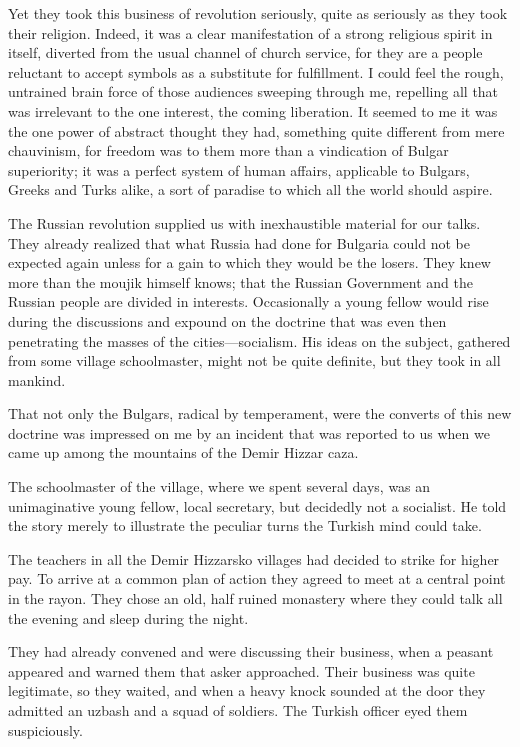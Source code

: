 \documentclass[a5paper,12pt]{book}
\begin{document}
Yet they took this business of revolution seriously, quite as seriously as they took their religion. Indeed, it was a clear manifestation of a strong religious spirit in itself, diverted from the usual channel of church service, for they are a people reluctant to accept symbols as a substitute for fulfillment. I could feel the rough, untrained brain force of those audiences sweeping through me, repelling all that was irrelevant to the one interest, the coming liberation. It seemed to me it was the one power of abstract thought they had, something quite different from mere chauvinism, for freedom was to them more than a vindication of Bulgar superiority; it was a perfect system of human affairs, applicable to Bulgars, Greeks and Turks alike, a sort of paradise to which all the world should aspire. 

The Russian revolution supplied us with inexhaustible material for our talks. They already realized that what Russia had done for Bulgaria could not be expected again unless for a gain to which they would be the losers. They knew more than the moujik himself knows; that the Russian Government and the Russian people are divided in interests. Occasionally a young fellow would rise during the discussions and expound on the doctrine that was even then penetrating the masses of the cities—socialism. His ideas on the subject, gathered from some village schoolmaster, might not be quite definite, but they took in all mankind. 

That not only the Bulgars, radical by temperament, were the converts of this new doctrine was impressed on me by an incident that was reported to us when we came up among the mountains of the Demir Hizzar caza. 

The schoolmaster of the village, where we spent several days, was an unimaginative young fellow, local secretary, but decidedly not a socialist. He told the story merely to illustrate the peculiar turns the Turkish mind could take. 

The teachers in all the Demir Hizzarsko villages had decided to strike for higher pay. To arrive at a common plan of action they agreed to meet at a central point in the rayon. They chose an old, half ruined monastery where they could talk all the evening and sleep during the night. 

They had already convened and were discussing their business, when a peasant appeared and warned them that asker approached. Their business was quite legitimate, so they waited, and when a heavy knock sounded at the door they admitted an uzbash and a squad of soldiers. The Turkish officer eyed them suspiciously. 
\end{document}

